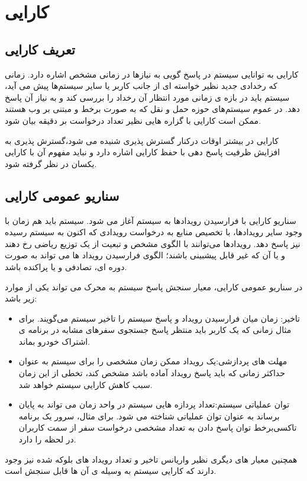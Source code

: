 \chapter{کارایی}
\section{تعریف کارایی}
کارایی به توانایی سیستم در پاسخ گویی به نیازها در زمانی مشخص اشاره دارد. زمانی که رخدادی جدید نظیر خواسته ای از جانب کاربر یا سایر سیستم‌ها پیش می آید، سیستم باید در بازه ی زمانی مورد انتظار آن رخداد را بررسی کند و به نیاز آن پاسخ دهد. در عموم سیستم‌های حوزه حمل و نقل که به صورت برخط و مبتنی بر وب هستند ممکن است کارایی با گزاره هایی نظیر تعداد درخواست بر دقیقه بیان شود.

کارایی در بیشتر اوقات درکنار گسترش پذیری شنیده می شود،‌گسترش پذیری به افزایش ظرفیت پاسخ دهی با حفظ کارایی اشاره دارد و نباید مفهوم آن با کارایی یکسان در نظر گرفته شود.
\section{سناریو عمومی کارایی}
سناریو کارایی با فرارسیدن رویداد‌ها به سیستم آغاز می شود. سیستم باید هم زمان با وجود سایر رویدادها، با تخصیص منابع به درخواست رویدادی که اکنون به سیستم رسیده نیز پاسخ دهد.
رویدادها می‌توانند با الگوی مشخص و تبعیت از یک توزیع ریاضی رخ دهند و یا آن که غیر قابل پیشبینی باشند؛ ‌الگوی فرارسیدن رویداد ها می تواند به صورت دوره ای، تصادفی و یا پراکنده باشد.

در سناریو عمومی کارایی، معیار سنجش پاسخ سیستم به محرک می تواند یکی از موارد زیر باشد:
\begin{itemize}
\item
تاخیر: زمان میان فرارسیدن رویداد و پاسخ سیستم را تاخیر سیستم می‌گویند. برای مثال زمانی که یک کاربر باید منتظر پاسخ جستجوی سفر‌های مشابه در برنامه ی اشتراک خودرو بماند.
\item
مهلت های پردازشی:یک رویداد ممکن زمان مشخصی را برای سیستم به عنوان حداکثر زمانی که باید پاسخ رویداد آماده باشد مشخص کند،‌ تخطی از این زمان سبب کاهش کارایی سیستم خواهد شد.
\item
توان عملیاتی سیستم:تعداد پردازه هایی سیستم در واحد زمان می تواند به پایان برساند به عنوان توان عملیاتی شناخته می شود. برای مثال، سرور یک برنامه ‌تاکسی‌برخط توان پاسخ دادن به تعداد مشخصی درخواست سفر از سمت کاربران در لحظه را دارد.
\end{itemize}
همچنین معیار های دیگری نظیر واریانس تاخیر و تعداد رویداد های بلوکه شده نیز وجود دارند که کارایی سیستم به وسیله ی آن ها قابل سنجش است.

